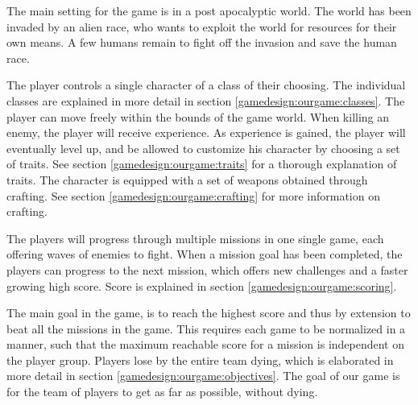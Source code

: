 
The main setting for the game is in a post apocalyptic world.
The world has been invaded by an alien race, who wants to exploit the world for resources for their own means.
A few humans remain to fight off the invasion and save the human race.

The player controls a single character of a class of their choosing. The individual classes are explained in more detail in section \ref{gamedesign:ourgame:classes}.
The player can move freely within the bounds of the game world.
When killing an enemy, the player will receive experience.
As experience is gained, the player will eventually level up, and be allowed to customize his character by choosing a set of traits. See section \ref{gamedesign:ourgame:traits} for a thorough explanation of traits.
The character is equipped with a set of weapons obtained through crafting. See section \ref{gamedesign:ourgame:crafting} for more information on crafting.

The players will progress through multiple missions in one single game, each offering waves of enemies to fight.
When a mission goal has been completed, the players can progress to the next mission, which offers new challenges and a faster growing high score. Score is explained in section \ref{gamedesign:ourgame:scoring}.

The main goal in the game, is to reach the highest score and thus by extension to beat all the missions in the game.
This requires each game to be normalized in a manner, such that the maximum reachable score for a mission is independent on the player group.
Players lose by the entire team dying, which is elaborated in more detail in section \ref{gamedesign:ourgame:objectives}.
The goal of our game is for the team of players to get as far as possible, without dying.




